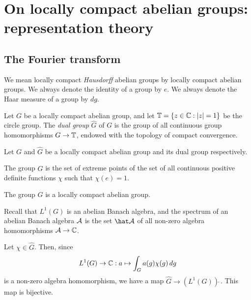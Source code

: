 \documentclass[10pt]{article}
\begin{document}
\newpage
\section{On locally compact abelian groups: representation theory}



\subsection{The Fourier transform}

We mean locally compact \emph{Hausdorff} abelian groups by locally compact abelian groups.
We always denote the identity of a group by $e$.
We always denote the Haar measure of a group by $dg$.


\begin{defn}
Let $G$ be a locally compact abelian group, and let $\mathbb{T}=\{z\in\mathbb{C}:|z|=1\}$ be the circle group.
The \emph{dual group} $\hat G$ of $G$ is the group of all continuous group homomorphisms $G\to\mathbb{T}$, endowed with the topology of compact convergence.
\end{defn}

\begin{prop}
Let $G$ and $\hat G$ be a locally compact abelian group and its dual group respectively.
\begin{parts}
\item The group $\hat G$ is the set of extreme points of the set of all continuous positive definite functions $\chi$ such that $\chi(e)=1$.
\item The group $\hat G$ is a locally compact abelian group.
\end{parts}
\end{prop}
\begin{pf}

\end{pf}



Recall that $L^1(G)$ is an abelian Banach algebra, and the spectrum of an abelian Banach algebra $\mathcal{A}$ is the set $\hat\cA$ of all non-zero algebra homomorphisms $\mathcal{A}\to\mathbb{C}$.

Let $\chi\in\hat G$.
Then, since
\[L^1(G)\to\mathbb{C}:a\mapsto\int_Ga(g)\chi(g)\,dg\]
is a non-zero algebra homomorphism, we have a map $\hat G\to(L^1(G))\hat\ $.
This map is bijective.


\begin{thm}
\end{thm}
\end{document}
